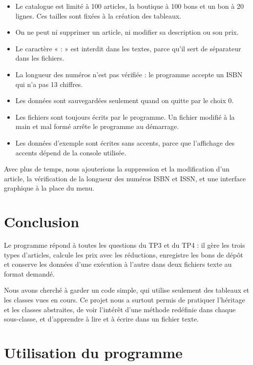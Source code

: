 \documentclass[11pt,a4paper]{article}
\begin{document}
\begin{itemize}
\item Le catalogue est limité à 100 articles, la boutique à 100 bons et un bon à 20 lignes. Ces
tailles sont fixées à la création des tableaux.
\item On ne peut ni supprimer un article, ni modifier sa description ou son prix.
\item Le caractère « : » est interdit dans les textes, parce qu'il sert de séparateur dans les
fichiers.
\item La longueur des numéros n'est pas vérifiée : le programme accepte un ISBN qui n'a pas 13
chiffres.
\item Les données sont sauvegardées seulement quand on quitte par le choix 0.
\item Les fichiers sont toujours écrits par le programme. Un fichier modifié à la main et mal formé
arrête le programme au démarrage.
\item Les données d'exemple sont écrites sans accents, parce que l'affichage des accents dépend de
la console utilisée.
\end{itemize}

Avec plus de temps, nous ajouterions la suppression et la modification d'un article, la vérification
de la longueur des numéros ISBN et ISSN, et une interface graphique à la place du menu.

\section{Conclusion}

Le programme répond à toutes les questions du TP3 et du TP4 : il gère les trois types d'articles,
calcule les prix avec les réductions, enregistre les bons de dépôt et conserve les données d'une
exécution à l'autre dans deux fichiers texte au format demandé.

Nous avons cherché à garder un code simple, qui utilise seulement des tableaux et les classes vues
en cours. Ce projet nous a surtout permis de pratiquer l'héritage et les classes abstraites, de
voir l'intérêt d'une méthode redéfinie dans chaque sous-classe, et d'apprendre à lire et à écrire
dans un fichier texte.

\appendix
\section{Utilisation du programme}
\end{document}
